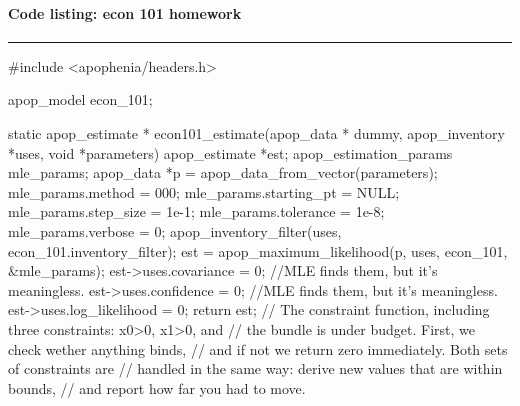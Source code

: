 \paragraph{Code listing: econ 101 homework}
\hrule 
#include <apophenia/headers.h>

apop_model econ_101;

static apop_estimate * econ101_estimate(apop_data * dummy, 
                            apop_inventory *uses, void *parameters){
apop_estimate           *est;
apop_estimation_params  mle_params;
apop_data               *p  = apop_data_from_vector(parameters);
    mle_params.method       = 000;
    mle_params.starting_pt  = NULL;
    mle_params.step_size    = 1e-1;
    mle_params.tolerance    = 1e-8;
    mle_params.verbose      = 0;
    apop_inventory_filter(uses, econ_101.inventory_filter);
    est = apop_maximum_likelihood(p, uses, econ_101, &mle_params);
    est->uses.covariance    = 0;    //MLE finds them, but it's meaningless.
    est->uses.confidence    = 0;    //MLE finds them, but it's meaningless.
    est->uses.log_likelihood  = 0;
    return est;
}
// The constraint function, including three constraints: x0>0, x1>0, and
// the bundle is under budget.  First, we check wether anything binds,
// and if not we return zero immediately.  Both sets of constraints are
// handled in the same way: derive new values that are within bounds,
// and report how far you had to move.

